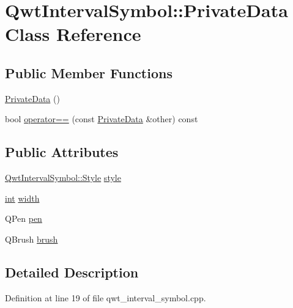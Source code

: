 \hypertarget{class_qwt_interval_symbol_1_1_private_data}{\section{Qwt\-Interval\-Symbol\-:\-:Private\-Data Class Reference}
\label{class_qwt_interval_symbol_1_1_private_data}
}
\subsection*{Public Member Functions}
\begin{DoxyCompactItemize}
\item 
\hyperlink{class_qwt_interval_symbol_1_1_private_data_a9dab65ab6b01131c96a907115b74fd2d}{Private\-Data} ()
\item 
bool \hyperlink{class_qwt_interval_symbol_1_1_private_data_a138b62c7f7dead024e5c1099debf9fb7}{operator==} (const \hyperlink{class_qwt_interval_symbol_1_1_private_data}{Private\-Data} \&other) const 
\end{DoxyCompactItemize}
\subsection*{Public Attributes}
\begin{DoxyCompactItemize}
\item 
\hyperlink{class_qwt_interval_symbol_a8fe960fd50b3ad08765ef8bb632ad77e}{Qwt\-Interval\-Symbol\-::\-Style} \hyperlink{class_qwt_interval_symbol_1_1_private_data_a58ce1a483567570ed2983e1810e75299}{style}
\item 
\hyperlink{ioapi_8h_a787fa3cf048117ba7123753c1e74fcd6}{int} \hyperlink{class_qwt_interval_symbol_1_1_private_data_ae94036f9ff3305149478415c429a6899}{width}
\item 
Q\-Pen \hyperlink{class_qwt_interval_symbol_1_1_private_data_ab2f3c626c909f2440d791417435cac11}{pen}
\item 
Q\-Brush \hyperlink{class_qwt_interval_symbol_1_1_private_data_a58b0b79185bc8b594dc92c7db6fe9f8f}{brush}
\end{DoxyCompactItemize}


\subsection{Detailed Description}


Definition at line 19 of file qwt\-\_\-interval\-\_\-symbol.\-cpp.



